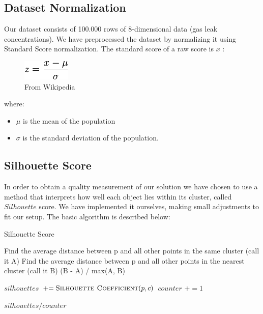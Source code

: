 \documentclass{lmproj}
\newcommand{\pluseq}{\mathrel{+}=}
\begin{document}
\subsection{Dataset Normalization}
Our dataset consists of 100.000 rows of 8-dimensional data (gas leak concentrations). We have preprocessed the dataset by normalizing it using Standard Score normalization. The standard score of a raw score is $x$ :

\begin{figure}[H]
	\centering
	\includegraphics{standard_score}
	\caption{From Wikipedia}
\end{figure}

where:
\begin{itemize}
	\item $\mu$ is the mean of the population
	\item $\sigma$ is the standard deviation of the population.
\end{itemize}

\subsection{Silhouette Score}

In order to obtain a quality measurement of our solution we have chosen to use a method that interprets how well each object lies within its cluster, called $Silhouette$ score. We have implemented it ourselves, making small adjustments to fit our setup. The basic algorithm is described below:

\bigskip


\begin{algorithm}[H]
	\caption{Silhouette Score}
	\begin{algorithmic}[1]
		\label{silhouette_coefficient}
		
			\State Find the average distance between p and all other points in the same cluster (call it A)
			\State Find the average distance between p and all other points in the nearest cluster (call it B)
			\Return (B - A) / max(A, B)
		
		\EndFunction
	\end{algorithmic}
	\bigskip
	\begin{algorithmic}[1]
		\label{silhouette_score}
		
			\State $silhouettes$ $\pluseq \Call {Silhouette Coefficient}{p,c}$
			\State $counter$ $\pluseq 1$
		\EndFor
		
		\Return $silhouettes/counter$
		\EndFunction
	\end{algorithmic}
\end{algorithm}
\end{document}
